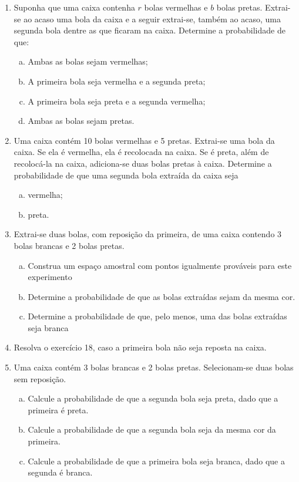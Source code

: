 \documentclass[../Notas.tex]{subfiles}
\begin{document}
\begin{enumerate}
    \item Suponha que uma caixa contenha $r$ bolas vermelhas e $b$ bolas pretas. Extrai-se ao acaso uma bola da caixa e a seguir extrai-se, também ao acaso, uma segunda bola dentre as que ficaram na caixa. Determine a probabilidade de que:
    \begin{enumerate}[a)]
    \item Ambas as bolas sejam vermelhas;
    \item A primeira bola seja vermelha e a segunda preta;
    \item A primeira bola seja preta e a segunda vermelha;
    \item Ambas as bolas sejam pretas.
    \end{enumerate}
    \item Uma caixa contém 10 bolas vermelhas e 5 pretas. Extrai-se uma bola da caixa. Se ela é vermelha, ela é recolocada na caixa. Se é preta, além de recolocá-la na caixa, adiciona-se duas bolas pretas à caixa. Determine a probabilidade de que uma segunda bola extraída da caixa seja
    \begin{enumerate}[a)]
    \item vermelha;
    \item preta.
    \end{enumerate}
    \item Extrai-se duas bolas, com reposição da primeira, de uma caixa contendo 3 bolas brancas e 2 bolas pretas.
    \begin{enumerate}[a)]
    \item Construa um espaço amostral com pontos igualmente prováveis para este experimento
    \item Determine a probabilidade de que as bolas extraídas sejam da mesma cor.
    \item Determine a probabilidade de que, pelo menos, uma das bolas extraídas seja branca
    \end{enumerate}
    \item Resolva o exercício 18, caso a primeira bola não seja reposta na caixa.
    \item Uma caixa contém 3 bolas brancas e 2 bolas pretas. Selecionam-se duas bolas sem reposição.
    \begin{enumerate}[a)]
    \item Calcule a probabilidade de que a segunda bola seja preta, dado que a primeira é preta.
    \item Calcule a probabilidade de que a segunda bola seja da mesma cor da primeira.
    \item Calcule a probabilidade de que a primeira bola seja branca, dado que a segunda é branca.

\end{enumerate}
\end{enumerate}
\end{document}
